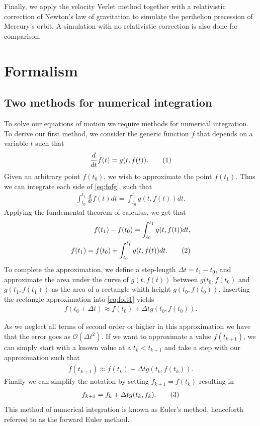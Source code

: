 \documentclass[reprint,english,notitlepage]{revtex4-1}  %
\newcommand\numberthis{\addtocounter{equation}{1}\tag{\theequation}}
\begin{document}
Finally, we apply the velocity Verlet method together with a relativistic correction of Newton's law of gravitation to simulate the perihelion precession of Mercury's orbit. A simulation with no relativistic correction is also done for comparison.

\section{Formalism} \label{sec:II}

\subsection{Two methods for numerical integration} \label{sec:II:a}
To solve our equations of motion we require methods for numerical integration. To derive our first method, we consider the generic function \(f\) that depends on a variable \(t\) such that
\begin{align*}
	\frac{d}{dt}f(t) = g(t, f(t)). \numberthis \label{eq:fofg}
\end{align*}
Given an arbitrary point \(f(t_{0})\), we wish to approximate the point \(f(t_{1})\). Thus we can integrate each side of \eqref{eq:fofg}, such that
\begin{align*}
	\int_{t_{0}}^{t_{1}} \frac{d}{dt} f(t) dt = \int_{t_{0}}^{t_{1}} g(t, f(t)) dt.
\end{align*}
Applying the fundemental theorem of calculus, we get that
\begin{align*}
	f(t_{1}) - f(t_{0}) = \int_{t_{0}}^{t_{1}} g(t, f(t)) dt, \\
	f(t_{1}) = f(t_{0}) + \int_{t_{0}}^{t_{1}} g(t, f(t)) dt. \numberthis \label{eq:foft1}
\end{align*}
To complete the approximation, we define a step-length \(\Delta t = t_{1}-t_{0}\), and approximate the area under the curve of \(g(t, f(t))\) between \(g(t_{0}, f(t_{0})\) and \(g(t_{1}, f(t_{1}))\) as the area of a rectangle whith height \(g(t_{0}, f(t_{0}))\). Inserting the rectangle approximation into \eqref{eq:foft1} yields
\begin{align*}
	f(t_{0} + \Delta t) \approx f(t_{0}) + \Delta t g(t_{0}, f(t_{0})).
\end{align*}

As we neglect all terms of second order or higher in this approximation we have that the error goes as $\mathcal{O}(\Delta t^2)$. 
If we want to approximate a value \(f(t_{k+1})\), we can simply start with a known value at a \(t_{k} < t_{k+1}\) and take a step with our approximation such that
\begin{align*}
	f(t_{k+1}) \approx f(t_{k}) + \Delta t g(t_{k}, f(t_{k})).
\end{align*}
Finally we can simplify the notation by setting \(f_{k+1} = f(t_{k})\) resulting in
\begin{align*}
	f_{k+1} = f_{k} + \Delta t g(t_{k}, f_{k}). \numberthis \label{eq:forwardEuler}
\end{align*}
This method of numerical integration is known as Euler's method, henceforth referred to as the forward Euler method.
\end{document}
